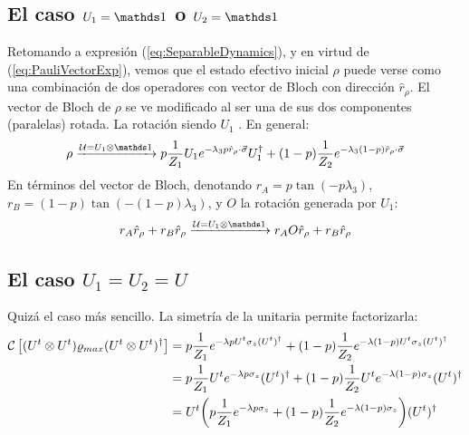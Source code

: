 \subsection{El caso $U_{1}=\Id$ o $U_{2}=\Id$}
Retomando a expresión (\ref{eq:SeparableDynamics}), y en virtud de (\ref{eq:PauliVectorExp}), vemos que el estado efectivo inicial $\rho$ puede verse como una combinación de dos operadores con vector de Bloch con dirección $\hat{r}_{\rho}$. El vector de Bloch de $\rho$ se ve modificado al ser una de sus dos componentes (paralelas) rotada. La rotación siendo $U_{1}$ . En general:
\begin{equation}\label{eq:SeparableDynamicsUxI}
    \rho\xrightarrow{\mcU=U_{1}\otimes \Id} p\frac{1}{Z_{1}}U_{1}e^{-\lambda_{3}p\hat{r}_{\rho}\cdot\vec{\sigma}}U_{1}^{\dag}+(1-p)\frac{1}{Z_{2}}e^{-\lambda_{3}(1-p)\hat{r}_{\rho}\cdot\vec{\sigma}}
\end{equation}
En términos del vector de Bloch, denotando $r_{A}=p\tan(-p\lambda_{3})$, $r_{B}=(1-p)\tan(-(1-p)\lambda_{3})$, y $O$ la rotación generada por $U_{1}$:
\begin{equation}
    r_{A}\hat{r}_{\rho}+r_{B}\hat{r}_{\rho}\xrightarrow{\mcU=U_{1}\otimes \Id}r_{A}O\hat{r}_{\rho}+r_{B}\hat{r}_{\rho}
\end{equation}

\subsection{El caso $U_{1}=U_{2}=U$}

Quizá el caso más sencillo. La simetría de la unitaria permite factorizarla:
\begin{align*}
\mathcal{C}\left[(U^{t}\otimes U^{t})\varrho_{max}(U^{t}\otimes U^{t})^{\dag}\right]&=p\frac{1}{Z_{1}}e^{-\lambda p U^{t}\sigma_{z}(U^t)^{\dag}}+(1-p)\frac{1}{Z_{2}}e^{-\lambda (1-p)U^{t}\sigma_{z}(U^t)^{\dag}}\\
&=p\frac{1}{Z_{1}}U^{t}e^{-\lambda p \sigma_{z}}(U^t)^{\dag}+(1-p)\frac{1}{Z_{2}}U^{t}e^{-\lambda (1-p)\sigma_{z}}(U^t)^{\dag}\\
&=U^{t}\qty(p\frac{1}{Z_{1}}e^{-\lambda p \sigma_{z}}+(1-p)\frac{1}{Z_{2}}e^{-\lambda (1-p)\sigma_{z}})(U^t)^{\dag}\\
\end{align*}
\newpage